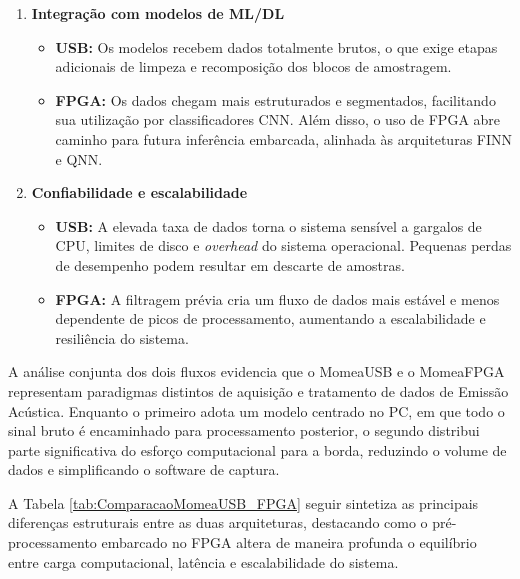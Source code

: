 \begin{enumerate}
	\item \textbf{Integração com modelos de ML/DL}
	\begin{itemize}
		\item \textbf{USB:}
		Os modelos recebem dados totalmente brutos, o que exige etapas adicionais de limpeza e recomposição dos blocos de amostragem.
		
		\item \textbf{FPGA:}
		Os dados chegam mais estruturados e segmentados, facilitando sua utilização por classificadores CNN. Além disso, o uso de FPGA abre caminho para futura inferência embarcada, alinhada às arquiteturas FINN e QNN.
	\end{itemize}
	
	\item \textbf{Confiabilidade e escalabilidade}
	\begin{itemize}
		\item \textbf{USB:}
		A elevada taxa de dados torna o sistema sensível a gargalos de CPU, limites de disco e \textit{overhead} do sistema operacional. Pequenas perdas de desempenho podem resultar em descarte de amostras.
		
		\item \textbf{FPGA:}
		A filtragem prévia cria um fluxo de dados mais estável e menos dependente de picos de processamento, aumentando a escalabilidade e resiliência do sistema.
	\end{itemize}
\end{enumerate}

A análise conjunta dos dois fluxos evidencia que o MomeaUSB e o MomeaFPGA representam paradigmas distintos de aquisição e tratamento de dados de Emissão Acústica. Enquanto o primeiro adota um modelo centrado no PC, em que todo o sinal bruto é encaminhado para processamento posterior, o segundo distribui parte significativa do esforço computacional para a borda, reduzindo o volume de dados e simplificando o software de captura.

A Tabela \ref{tab:ComparacaoMomeaUSB_FPGA} seguir sintetiza as principais diferenças estruturais entre as duas arquiteturas, destacando como o pré-processamento embarcado no FPGA altera de maneira profunda o equilíbrio entre carga computacional, latência e escalabilidade do sistema.

